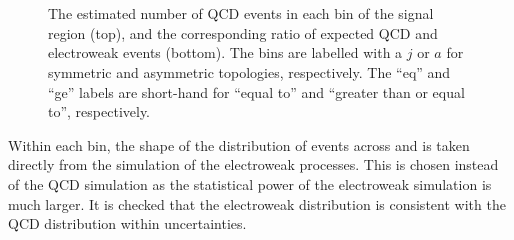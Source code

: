 \begin{figure}[!h]
\centering
{}
 \\
 \\
\caption{The estimated number of QCD events in each \njht bin of the signal 
region (top), and the corresponding ratio of expected QCD and electroweak 
events (bottom). The \njet bins are labelled with a $j$ or $a$ for symmetric 
and asymmetric topologies, respectively. The ``eq'' and ``ge'' labels are 
short-hand for ``equal to'' and ``greater than or equal to'', respectively.}
\label{fig:qcdestimation}
\end{figure}

Within each \njht bin, the shape of the distribution of events across \nb and 
\mht is taken directly from the simulation of the electroweak processes. This 
is chosen instead of the QCD simulation as the statistical power of the 
electroweak simulation is much larger. It is checked that the electroweak 
\nbmht distribution is consistent with the QCD distribution within 
uncertainties.


